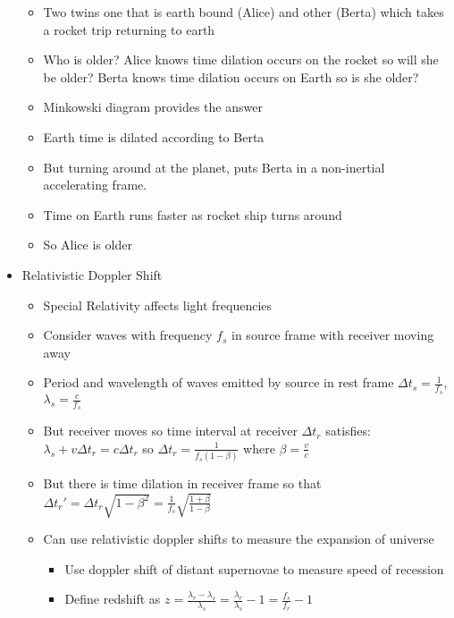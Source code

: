 \documentclass[12pt]{article}
\begin{document}
\begin{itemize}
\begin{itemize}
        \item Two twins one that is earth bound (Alice) and other (Berta) which takes a rocket trip returning to earth
        \item Who is older? Alice knows time dilation occurs on the rocket so will she be older? Berta knows time dilation occurs on Earth so is she older?
        \item Minkowski diagram provides the answer
        \item Earth time is dilated according to Berta
        \item But turning around at the planet, puts Berta in a non-inertial accelerating frame. 
        \item Time on Earth runs faster as rocket ship turns around
        \item So Alice is older
    \end{itemize}
    \item Relativistic Doppler Shift \begin{itemize}
        \item Special Relativity affects light frequencies
        \item Consider waves with frequency $f_s$ in source frame with receiver moving away
        \item Period and wavelength of waves emitted by source in rest frame $\Delta t_s = \frac{1}{f_s}$, $\lambda_s =\frac{c}{f_s}$
        \item But receiver moves so time interval at receiver $\Delta t_r$ satisfies: $\lambda_s + v \Delta t_r = c \Delta t_r$ so $\Delta t_r = \frac{1}{f_s(1-\beta)}$ where $\beta = \frac{v}{c}$
        \item But there is time dilation in receiver frame so that $\Delta t_r' = \Delta t_r \sqrt{1-\beta^2} = \frac{1}{f_s} \sqrt{\frac{1+\beta}{1-\beta}}$
        \item Can use relativistic doppler shifts to measure the expansion of universe \begin{itemize}
            \item Use doppler shift of distant supernovae to measure speed of recession
            \item Define redshift as $z = \frac{\lambda_r - \lambda_s}{\lambda_s} = \frac{\lambda_r}{\lambda_s} - 1 = \frac{f_s}{f_r} - 1$
        \end{itemize}
    \end{itemize}



\end{itemize}
\end{document}
